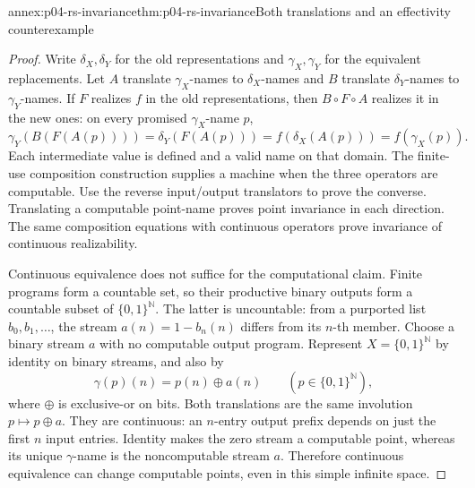 \begin{annexitem}{annex:p04-rs-invariance}{thm:p04-rs-invariance}{Both translations and an effectivity counterexample}
\begin{proof}
Write \(\delta_X,\delta_Y\) for the old representations and
\(\gamma_X,\gamma_Y\) for the equivalent replacements.
Let \(A\) translate \(\gamma_X\)-names to \(\delta_X\)-names and
\(B\) translate \(\delta_Y\)-names to \(\gamma_Y\)-names.
If \(F\) realizes \(f\) in the old representations, then
\(B\circ F\circ A\) realizes it in the new ones: on every
promised \(\gamma_X\)-name \(p\),
\[
 \gamma_Y(B(F(A(p))))
 =\delta_Y(F(A(p)))
 =f(\delta_X(A(p)))
 =f(\gamma_X(p)).
\]
Each intermediate value is defined and a valid name on that
domain. The finite-use composition construction supplies a
machine when the three operators are computable.
Use the reverse input/output translators to prove the converse.
Translating a computable point-name proves point invariance in
each direction. The same composition equations with continuous
operators prove invariance of continuous realizability.

Continuous equivalence does not suffice for the computational
claim. Finite programs form a countable set, so their productive
binary outputs form a countable subset of \(\{0,1\}^{\mathbb N}\).
The latter is uncountable: from a purported list \(b_0,b_1,\ldots\),
the stream \(a(n)=1-b_n(n)\) differs from its \(n\)-th member.
Choose a binary stream \(a\) with no computable output program.
Represent \(X=\{0,1\}^{\mathbb N}\) by identity on binary streams,
and also by
\[
 \gamma(p)(n)=p(n)\mathbin{\oplus}a(n)
 \qquad(p\in\{0,1\}^{\mathbb N}),
\]
where \(\oplus\) is exclusive-or on bits. Both translations are
the same involution \(p\mapsto p\oplus a\). They are continuous:
an \(n\)-entry output prefix depends on just the first \(n\)
input entries. Identity makes the zero stream a computable point,
whereas its unique \(\gamma\)-name is the noncomputable stream
\(a\). Therefore continuous equivalence can change computable
points, even in this simple infinite space.
\end{proof}
\end{annexitem}

